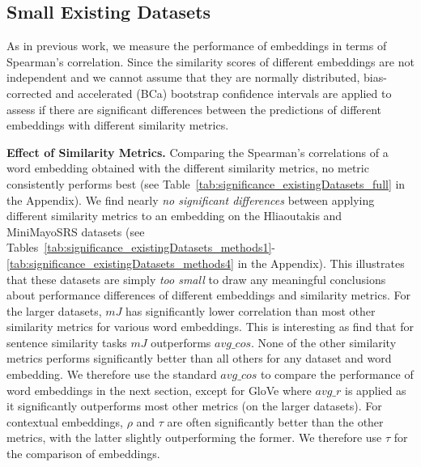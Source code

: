 \documentclass[letterpaper]{article} %
\begin{document}
\subsection{Small Existing Datasets}
As in previous work, we measure the performance of embeddings in terms of Spearman's correlation. Since the similarity scores of different embeddings are not independent and we cannot assume that they are normally distributed, bias-corrected and accelerated (BCa) bootstrap confidence intervals \cite{ZhelezniakEtAl2019-fuzzyJaccard}
are applied to assess if there are significant differences between the predictions of different embeddings with different similarity metrics.

\noindent\textbf{Effect of Similarity Metrics.}
Comparing the Spearman's correlations of a word embedding obtained with the different similarity metrics, no metric consistently performs best (see Table~\ref{tab:significance_existingDatasets_full} in the Appendix).
We find nearly \emph{no significant differences} between applying different similarity metrics to an embedding on the Hliaoutakis and \mbox{MiniMayoSRS} datasets (see Tables~\ref{tab:significance_existingDatasets_methods1}-\ref{tab:significance_existingDatasets_methods4} in the Appendix). This illustrates that these datasets are simply \emph{too small} to draw any meaningful conclusions about performance differences of different embeddings and similarity metrics.
For the larger datasets, $mJ$ has significantly lower correlation than most other similarity metrics for various word embeddings. This is interesting as \citeauthor{ZhelezniakEtAl2019-fuzzyJaccard}  find that for sentence similarity tasks $mJ$ outperforms $avg\_cos$.
None of the other similarity metrics performs significantly better than all others for any dataset and word embedding. 
We therefore use the standard $avg\_cos$ 
to compare the performance of word embeddings in the next section, except for GloVe where $avg\_r$ is applied as it significantly outperforms most other metrics (on the larger datasets).
For contextual embeddings, $\rho$ and $\tau$ are often
significantly better than the other metrics, with the latter slightly outperforming the former. We therefore use $\tau$ for the
comparison of embeddings. 
\end{document}
